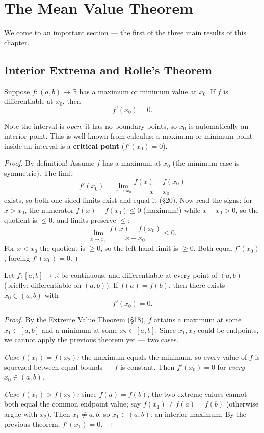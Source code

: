 \documentclass[11pt]{report}
\begin{document}
\section{The Mean Value Theorem}

We come to an important section --- the first of the three main results of this chapter.

\subsection{Interior Extrema and Rolle's Theorem}

\begin{thmbox}
Suppose $f: (a,b) \to \mathbb{R}$ has a maximum or minimum value at $x_0$. If $f$ is differentiable at $x_0$, then
\[
f'(x_0) = 0.
\]
\end{thmbox}

Note the interval is \emph{open}: it has no boundary points, so $x_0$ is automatically an interior point. This is well known from calculus: a maximum or minimum point inside an interval is a \textbf{critical point} ($f'(x_0) = 0$).

\begin{proof}
By definition! Assume $f$ has a maximum at $x_0$ (the minimum case is symmetric). The limit
\[
f'(x_0) = \lim_{x\to x_0} \frac{f(x) - f(x_0)}{x - x_0}
\]
exists, so both one-sided limits exist and equal it (\S 20). Now read the signs: for $x > x_0$, the numerator $f(x) - f(x_0) \leq 0$ (maximum!) while $x - x_0 > 0$, so the quotient is $\leq 0$, and limits preserve $\leq$:
\[
\lim_{x \to x_0^+} \frac{f(x) - f(x_0)}{x - x_0} \leq 0.
\]
For $x < x_0$ the quotient is $\geq 0$, so the left-hand limit is $\geq 0$. Both equal $f'(x_0)$, forcing $f'(x_0) = 0$.
\end{proof}

\begin{thmbox}
Let $f: [a,b] \to \mathbb{R}$ be continuous, and differentiable at every point of $(a,b)$ (briefly: differentiable on $(a,b)$). If $f(a) = f(b)$, then there exists $x_0 \in (a,b)$ with
\[
f'(x_0) = 0.
\]
\end{thmbox}

\begin{proof}
By the Extreme Value Theorem (\S 18), $f$ attains a maximum at some $x_1 \in [a,b]$ and a minimum at some $x_2 \in [a,b]$. Since $x_1, x_2$ could be endpoints, we cannot apply the previous theorem yet --- two cases.

\emph{Case $f(x_1) = f(x_2)$:} the maximum equals the minimum, so every value of $f$ is squeezed between equal bounds --- $f$ is constant. Then $f'(x_0) = 0$ for \emph{every} $x_0 \in (a,b)$.

\emph{Case $f(x_1) > f(x_2)$:} since $f(a) = f(b)$, the two extreme values cannot both equal the common endpoint value; say $f(x_1) \neq f(a) = f(b)$ (otherwise argue with $x_2$). Then $x_1 \neq a, b$, so $x_1 \in (a,b)$: an interior maximum. By the previous theorem, $f'(x_1) = 0$.
\end{proof}
\end{document}
